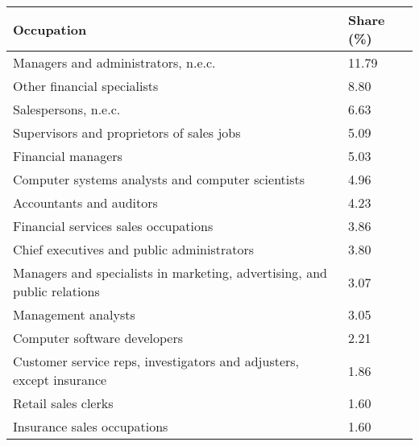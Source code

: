 

\begin{tabular}[t]{ll}
\toprule
Occupation & Share (\%)\\
\midrule
Managers and administrators, n.e.c. & 11.79\\
Other financial specialists & 8.80\\
Salespersons, n.e.c. & 6.63\\
Supervisors and proprietors of sales jobs & 5.09\\
Financial managers & 5.03\\
Computer systems analysts and computer scientists & 4.96\\
Accountants and auditors & 4.23\\
Financial services sales occupations & 3.86\\
Chief executives and public administrators & 3.80\\
Managers and specialists in marketing, advertising, and public relations & 3.07\\
Management analysts & 3.05\\
Computer software developers & 2.21\\
Customer service reps, investigators and adjusters, except insurance & 1.86\\
Retail sales clerks & 1.60\\
Insurance sales occupations & 1.60\\
\bottomrule
\end{tabular}

